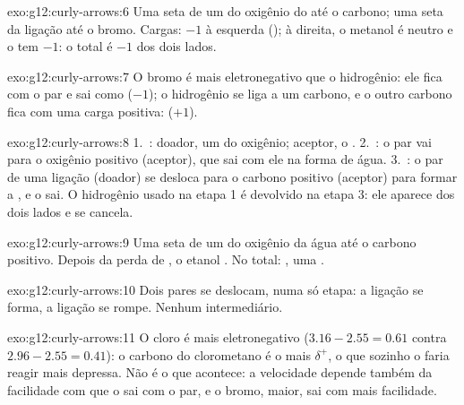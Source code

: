 \begin{solution}{exo:g12:curly-arrows:6}
Uma seta de um  do oxigênio do  até o carbono;
uma seta da ligação  até o bromo. Cargas: $-1$ à esquerda
(); à direita, o metanol é neutro e o  tem $-1$: o
total é $-1$ dos dois lados.
\end{solution}

\begin{solution}{exo:g12:curly-arrows:7}
O bromo é mais eletronegativo que o hidrogênio: ele fica com o par e sai
como  ($-1$); o hidrogênio se liga a um carbono, e o outro
carbono fica com uma carga positiva:  ($+1$).
\end{solution}

\begin{solution}{exo:g12:curly-arrows:8}
1.~: doador, um  do
oxigênio; aceptor, o . 2.~: o
par  vai para o oxigênio positivo (aceptor), que sai com ele na
forma de água. 3.~: o par de uma ligação
 (doador) se desloca para o carbono positivo (aceptor) para
formar a , e o  sai. O  hidrogênio usado na etapa
1 é devolvido na etapa 3: ele aparece dos dois lados e se cancela.
\end{solution}

\begin{solution}{exo:g12:curly-arrows:9}
Uma seta de um  do oxigênio da água até o carbono
positivo. Depois da perda de , o etanol . No
total: , uma .
\end{solution}

\begin{solution}{exo:g12:curly-arrows:10}
Dois pares se deslocam, numa só etapa: a ligação  se forma, a
ligação  se rompe. Nenhum intermediário.
\end{solution}

\begin{solution}{exo:g12:curly-arrows:11}
O cloro é mais eletronegativo ($3.16 - 2.55 = 0.61$ contra
$2.96 - 2.55 = 0.41$): o carbono do clorometano é o mais $\delta^+$, o
que sozinho o faria reagir mais depressa. Não é o que acontece: a
velocidade depende também da facilidade com que o  sai com o
par, e o bromo, maior, sai com mais facilidade.
\end{solution}

